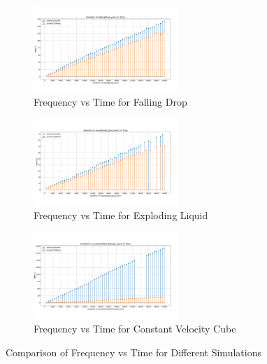 \begin{figure}[htbp]
    \centering
    
    \begin{subfigure}[b]{\textwidth}
        \centering
        \includegraphics[width=0.6\textwidth]{graphs/fallingDrop/freqvstimeiter.png}
        \caption{\scriptsize Frequency vs Time for Falling Drop}
        \label{fig:fallingDrop}
    \end{subfigure}

    \begin{subfigure}[b]{\textwidth}
        \centering
        \includegraphics[width=0.6\textwidth]{graphs/explodingLiquid/freqvstimeiter.png}
        \caption{\scriptsize Frequency vs Time for Exploding Liquid}
        \label{fig:explodingLiquid}
    \end{subfigure}

    \begin{subfigure}[b]{\textwidth}
        \centering
        \includegraphics[width=0.6\textwidth]{graphs/constantVelocityCube/freqvstimeiter.png}
        \caption{\scriptsize Frequency vs Time for Constant Velocity Cube}
        \label{fig:constantVelocityCube}
    \end{subfigure}

    \caption{Comparison of Frequency vs Time for Different Simulations}
    \label{fig:main}
\end{figure}




